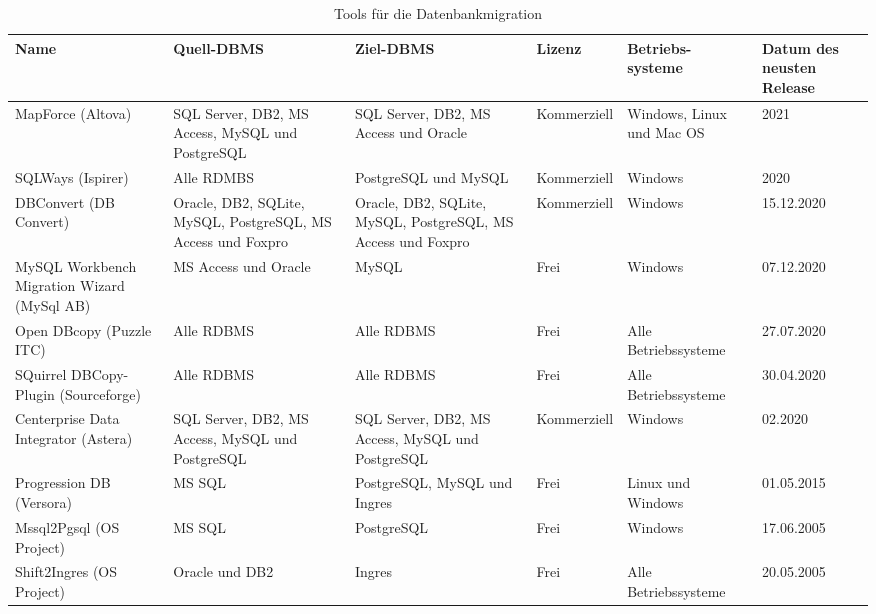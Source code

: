 \renewcommand{\thefootnote}{\roman{footnote}}
\begin{table}[H]
	\caption{Tools für die Datenbankmigration}
	\begin{center}
		\begin{tabular}{ |p{2.5cm}|p{3cm}|p{3cm}|p{2cm}|p{2cm}|p{1.5cm}| }
			\hline
			\textbf{Name} & \textbf{Quell-DBMS} &  \textbf{Ziel-DBMS} &\textbf{Lizenz} & \textbf{Betriebs- systeme} & Datum des neusten Release\\
			\hline
			MapForce (Altova)\footnotemark[1]& SQL Server, DB2, MS Access, MySQL und PostgreSQL  & SQL Server, DB2, MS Access und Oracle & Kommerziell & Windows, Linux und Mac OS & 2021 \\
			\hline
			SQLWays (Ispirer)\footnotemark[2] & Alle RDMBS & PostgreSQL und MySQL & Kommerziell & Windows &2020 \\
			\hline
			DBConvert (DB Convert)\footnotemark[3] & Oracle, DB2, SQLite, MySQL, PostgreSQL, MS Access und Foxpro & Oracle, DB2, SQLite, MySQL, PostgreSQL, MS Access und Foxpro & Kommerziell & Windows & 15.12.2020 \\
			\hline
			MySQL Workbench Migration Wizard (MySql AB) \footnotemark[4] &  MS Access und Oracle &  MySQL & Frei & Windows & 07.12.2020  \\
			\hline
			Open DBcopy (Puzzle ITC) \footnotemark[5] & Alle RDBMS& Alle RDBMS & Frei & Alle Betriebssysteme & 27.07.2020 \\
			\hline
			SQuirrel DBCopy-Plugin (Sourceforge)\footnotemark[6] & Alle RDBMS  & Alle RDBMS & Frei & Alle Betriebssysteme & 30.04.2020\\
			\hline
			Centerprise Data Integrator (Astera)\footnotemark[7] & SQL Server, DB2, MS Access, MySQL und PostgreSQL& SQL Server, DB2, MS Access, MySQL und PostgreSQL& 
			Kommerziell & Windows & 02.2020 \\
			\hline
			Progression DB (Versora)\footnotemark[8] &  MS SQL &  PostgreSQL, MySQL und	Ingres & Frei & Linux und Windows & 01.05.2015 \\ %
			\hline
			Mssql2Pgsql (OS Project)\footnotemark[9] &   MS SQL&   PostgreSQL  & Frei & Windows & 17.06.2005 \\ %
			\hline
			Shift2Ingres (OS Project)\footnotemark[10] & Oracle und DB2 & Ingres & Frei &  Alle Betriebssysteme & 20.05.2005 \\ %
			\hline

\end{tabular}
\end{center}
\end{table}
